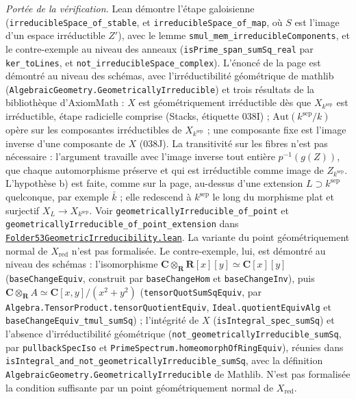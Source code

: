 \begingroup\raggedright
\noindent\emph{Portée de la vérification.} Lean démontre l'étape galoisienne (\texttt{irreducibleSpace\_of\_stable}, et \texttt{irreducibleSpace\_of\_map}, où $S$ est l'image d'un espace irréductible $Z'$), avec le lemme \texttt{smul\_mem\_irreducibleComponents}, et le contre-exemple au niveau des anneaux (\texttt{isPrime\_span\_sumSq\_real} par \texttt{ker\_toLines}, et \texttt{not\_irreducibleSpace\_complex}). L'énoncé de la page est démontré au niveau des schémas, avec l'irréductibilité géométrique de mathlib (\texttt{AlgebraicGeometry.\allowbreak{}GeometricallyIrreducible}) et trois résultats de la bibliothèque d'AxiomMath \cite{axiomstacks} : $X$ est géométriquement irréductible dès que $X_{k^{\mathrm{sep}}}$ est irréductible, étape radicielle comprise (Stacks, étiquette 038I) ; $\mathrm{Aut}(k^{\mathrm{sep}}/k)$ opère sur les composantes irréductibles de $X_{k^{\mathrm{sep}}}$ ; une composante fixe est l'image inverse d'une composante de $X$ (038J). La transitivité sur les fibres n'est pas nécessaire : l'argument travaille avec l'image inverse tout entière $p^{-1}(g(Z))$, que chaque automorphisme préserve et qui est irréductible comme image de $Z_{k^{\mathrm{sep}}}$. L'hypothèse b) est faite, comme sur la page, au-dessus d'une extension $L \supset k^{\mathrm{sep}}$ quelconque, par exemple $\bar k$ ; elle redescend à $k^{\mathrm{sep}}$ le long du morphisme plat et surjectif $X_L \to X_{k^{\mathrm{sep}}}$. Voir \texttt{geometricallyIrreducible\_of\_point} et \texttt{geometricallyIrreducible\_of\_point\_extension} dans \href{\leanblobmain/AlgebraicGeometry/Folder53GeometricIrreducibility.lean}{\texttt{Folder53GeometricIrreducibility.\allowbreak{}lean}}. La variante du point géométriquement normal de $X_{\mathrm{red}}$ n'est pas formalisée. Le contre-exemple, lui, est démontré au niveau des schémas : l'isomorphisme $\mathbf C \otimes_{\mathbf R} \mathbf R[x][y] \simeq \mathbf C[x][y]$ (\texttt{baseChangeEquiv}, construit par \texttt{baseChangeHom} et \texttt{baseChangeInv}), puis $\mathbf C \otimes_{\mathbf R} A \simeq \mathbf C[x,y]/(x^2 + y^2)$ (\texttt{tensorQuotSumSqEquiv}, par \texttt{Algebra.\allowbreak{}TensorProduct.\allowbreak{}tensorQuotientEquiv}, \texttt{Ideal.\allowbreak{}quotientEquivAlg} et \texttt{baseChangeEquiv\_tmul\_sumSq}) ; l'intégrité de $X$ (\texttt{isIntegral\_spec\_sumSq}) et l'absence d'irréductibilité géométrique (\texttt{not\_geometricallyIrreducible\_sumSq}, par \texttt{pullbackSpecIso} et \texttt{PrimeSpectrum.\allowbreak{}homeomorphOfRingEquiv}), réunies dans \texttt{isIntegral\_and\_not\_geometricallyIrreducible\_sumSq}, avec la définition \texttt{AlgebraicGeometry.\allowbreak{}GeometricallyIrreducible} de Mathlib. N'est pas formalisée la condition suffisante par un point géométriquement normal de $X_{\mathrm{red}}$.\par\endgroup
